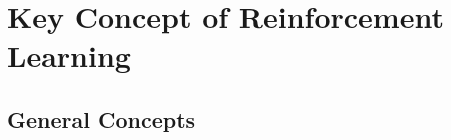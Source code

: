 \chapter{Key Concept of Reinforcement Learning}

\section{General Concepts}
\cite{brockman2016openai}
\lipsum[10-20]
